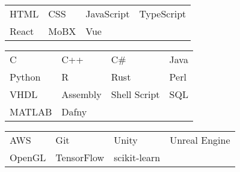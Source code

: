 \documentclass[paper=a4, fontsize=10pt]{style}
\begin{document}
{	
		\begin{tabular}{llll}
			HTML & CSS & JavaScript & TypeScript \\
			React & MoBX & Vue
		\end{tabular}

		\medskip\normalsize

		\begin{tabular}{llll}
			C & C++ & C\# & Java \\
			Python & R & Rust & Perl \\
			VHDL & Assembly & Shell Script & SQL \\
			MATLAB & Dafny
		\end{tabular}

		\medskip\normalsize

		\begin{tabular}{llll}
			AWS & Git & Unity & Unreal Engine \\
			OpenGL & TensorFlow & scikit-learn
		\end{tabular}
}
\end{document}
